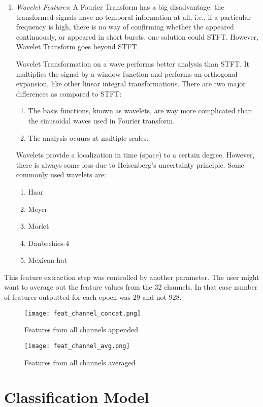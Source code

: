 \begin{enumerate}
\item \emph{Wavelet Features}: A Fourier Transform has a big disadvantage: the transformed signals have no temporal information at all, i.e., if a particular frequency is high, there is no way of confirming whether the appeared continuously, or appeared in short bursts. one solution could STFT. However, Wavelet Transform goes beyond STFT.

Wavelet Transformation on a wave performs better analysis than STFT. It multiplies the signal by a window function and performs an orthogonal expansion, like other linear integral transformations. There are two major differences as compared to STFT:
\begin{enumerate}
    \item The basis functions, known as wavelets, are way more complicated than the sinusoidal waves used in Fourier transform.
    \item The analysis ocuurs at multiple scales.
\end{enumerate}
Wavelets provide a localization in time (space) to a certain degree. However, there is always some loss due to Heisenberg's uncertainty principle. Some commonly used wavelets are:
\begin{enumerate}
    \item Haar
    \item Meyer
    \item Morlet
    \item Daubechies-4
    \item Mexican hat
\end{enumerate}
\end{enumerate}
This feature extraction step was controlled by another parameter. The user might want to average out the feature values from the 32 channels. In that case number of features outputted for each epoch was $29$ and not $928$.

\begin{figure}[H]
\centering
\texttt{[image: feat\_channel\_concat.png]}
\caption{Features from all channels appended}
\label{fig-5-4}
\end{figure}

\begin{figure}[H]
\centering
\texttt{[image: feat\_channel\_avg.png]}
\caption{Features from all channels averaged}
\label{fig-5-5}
\end{figure}

\section{Classification Model}

